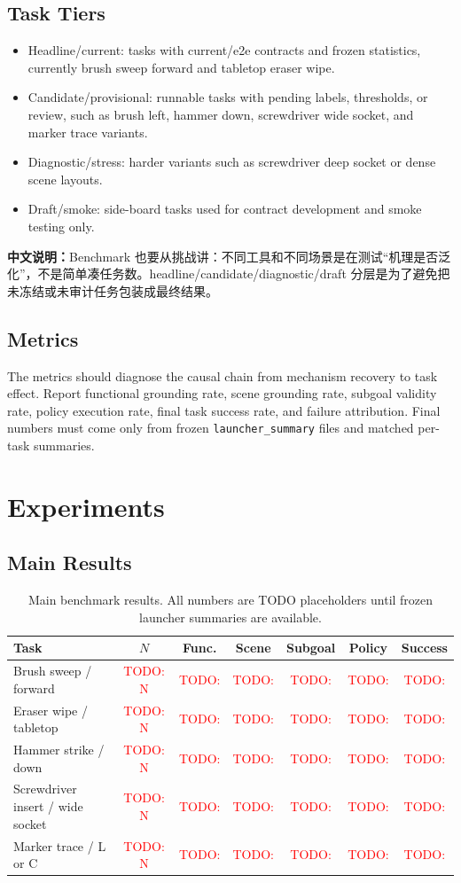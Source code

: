 \documentclass[journal]{IEEEtran}
\newcommand{\todo}[1]{\textcolor{red}{TODO: #1}}
\newcommand{\cn}[1]{\par\smallskip\noindent\textbf{中文说明：}#1\par\smallskip}
\begin{document}
\subsection{Task Tiers}
\begin{itemize}
  \item Headline/current: tasks with current/e2e contracts and frozen
  statistics, currently brush sweep forward and tabletop eraser wipe.
  \item Candidate/provisional: runnable tasks with pending labels, thresholds,
  or review, such as brush left, hammer down, screwdriver wide socket, and
  marker trace variants.
  \item Diagnostic/stress: harder variants such as screwdriver deep socket or
  dense scene layouts.
  \item Draft/smoke: side-board tasks used for contract development and smoke
  testing only.
\end{itemize}

\cn{Benchmark 也要从挑战讲：不同工具和不同场景是在测试“机理是否泛化”，不是简单凑任务数。headline/candidate/diagnostic/draft 分层是为了避免把未冻结或未审计任务包装成最终结果。}

\subsection{Metrics}
The metrics should diagnose the causal chain from mechanism recovery to task
effect. Report functional grounding rate, scene grounding rate, subgoal
validity rate, policy execution rate, final task success rate, and failure
attribution. Final numbers must come only from frozen
\texttt{launcher\_summary} files and matched per-task summaries.

\section{Experiments}
\subsection{Main Results}
\begin{table}[t]
\centering
\caption{Main benchmark results. All numbers are TODO placeholders until frozen
launcher summaries are available.}
\begin{tabular}{lcccccc}
\toprule
Task & $N$ & Func. & Scene & Subgoal & Policy & Success \\
\midrule
Brush sweep / forward & \todo{N} & \todo{} & \todo{} & \todo{} & \todo{} & \todo{} \\
Eraser wipe / tabletop & \todo{N} & \todo{} & \todo{} & \todo{} & \todo{} & \todo{} \\
Hammer strike / down & \todo{N} & \todo{} & \todo{} & \todo{} & \todo{} & \todo{} \\
Screwdriver insert / wide socket & \todo{N} & \todo{} & \todo{} & \todo{} & \todo{} & \todo{} \\
Marker trace / L or C & \todo{N} & \todo{} & \todo{} & \todo{} & \todo{} & \todo{} \\
\bottomrule
\end{tabular}
\label{tab:main_results}
\end{table}
\end{document}

